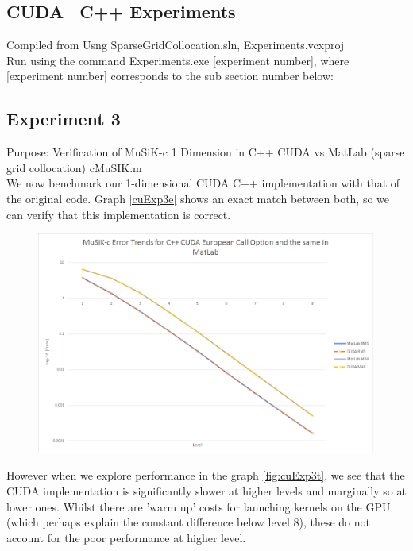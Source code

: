 \documentclass[a4paper]{amsart}
\begin{document}
\subsection{CUDA \ C++ Experiments}

Compiled from Usng SparseGridCollocation.sln, Experiments.vcxproj \\
Run using the command Experiments.exe [experiment number], 
where [experiment number] corresponds to the sub section number below:


\subsection{Experiment 3}\label{cuExp3}

Purpose: Verification of MuSiK-c 1 Dimension in C++ CUDA vs MatLab (sparse grid collocation) cMuSIK.m\\

We now benchmark our 1-dimensional CUDA C++ implementation with that of the original code. Graph \ref{cuExp3e} shows an exact match between both, so we can verify that this implementation is correct.

\begin{figure}[h]
\centering
\includegraphics[scale=0.3]{cuExp3-errors.png}
\caption {}
\label {fig:cuExp3e}
\end{figure}

However when we explore performance in the graph \ref{fig:cuExp3t}, we see that the CUDA implementation is significantly slower at higher levels and marginally so at lower ones. Whilst there are 'warm up' costs for launching kernels on the GPU (which perhaps explain the constant difference below level 8), these do not account for the poor performance at higher level.
\end{document}
